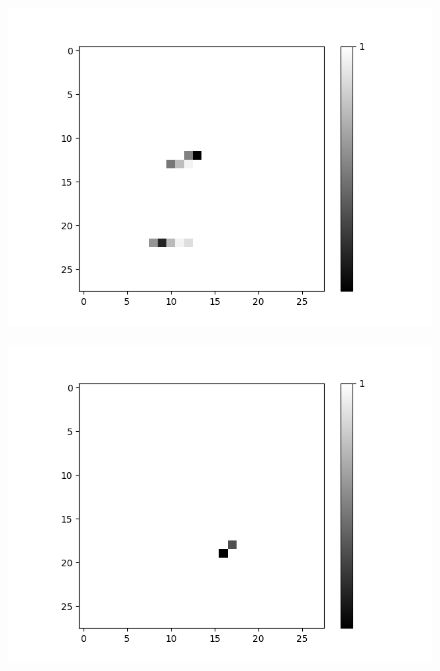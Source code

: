 \begin{figure}[H]
\begin{minipage}[b]{0.19\textwidth}
		\includegraphics[width=\textwidth]{LoAE(AND)(20LF)/True/Feature-10.png}
		\label{}
	\end{minipage}
	\begin{minipage}[b]{0.19\textwidth}
		\captionsetup{labelformat=empty}
		\includegraphics[width=\textwidth]{LoAE(AND)(20LF)/True/Feature-12.png}
		\label{}
	\end{minipage}
	\begin{minipage}[b]{0.19\textwidth}
		\captionsetup{labelformat=empty}

\end{minipage}
\end{figure}
